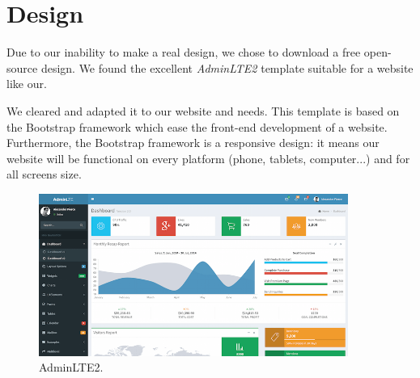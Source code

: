 \section{Design}
Due to our inability to make a real design, we chose to download a free open-source design. We found the excellent \textit{AdminLTE2} template suitable for a website like our.
\newline

We cleared and adapted it to our website and needs.
This template is based on the Bootstrap framework which ease the front-end development of a website. Furthermore, the Bootstrap framework is a responsive design: it means our website will be functional on every platform (phone, tablets, computer...) and for all screens size.

\begin{figure}[!ht]
  \caption{AdminLTE2.}
  \centering
    \includegraphics[width=0.9\textwidth]{img/design.png}
\end{figure}





